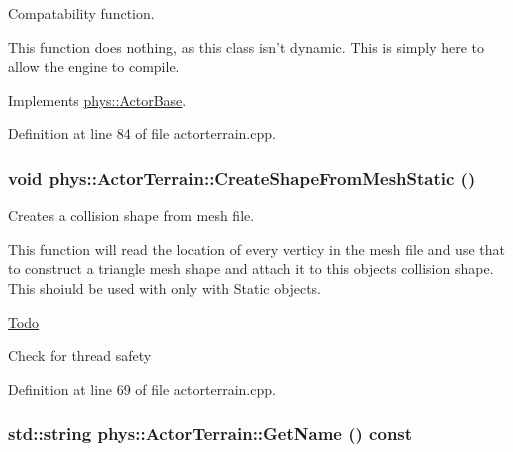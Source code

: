 Compatability function. 

This function does nothing, as this class isn't dynamic. This is simply here to allow the engine to compile. 

Implements \hyperlink{classphys_1_1ActorBase_aa41370f6d2031a9dad8df45bd7f3bcc6}{phys::ActorBase}.



Definition at line 84 of file actorterrain.cpp.

\hypertarget{classphys_1_1ActorTerrain_a2403c40af6799e67c9aff1520b02dc0b}{
\subsubsection[{CreateShapeFromMeshStatic}]{\setlength{\rightskip}{0pt plus 5cm}void phys::ActorTerrain::CreateShapeFromMeshStatic ()}}
\label{de/d74/classphys_1_1ActorTerrain_a2403c40af6799e67c9aff1520b02dc0b}


Creates a collision shape from mesh file. 

This function will read the location of every verticy in the mesh file and use that to construct a triangle mesh shape and attach it to this objects collision shape. This shoiuld be used with only with Static objects. 

\begin{Desc}
\item[\hyperlink{todo__todo000003}{Todo}]
\begin{DoxyItemize}
\item Check for thread safety 
\end{DoxyItemize}\end{Desc}




Definition at line 69 of file actorterrain.cpp.

\hypertarget{classphys_1_1ActorTerrain_a08f306ae189e55d780dcaa2c43d7b6eb}{
\subsubsection[{GetName}]{\setlength{\rightskip}{0pt plus 5cm}std::string phys::ActorTerrain::GetName () const}}
\label{de/d74/classphys_1_1ActorTerrain_a08f306ae189e55d780dcaa2c43d7b6eb}


